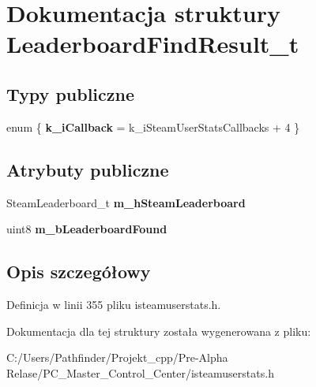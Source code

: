\hypertarget{struct_leaderboard_find_result__t}{}\section{Dokumentacja struktury Leaderboard\+Find\+Result\+\_\+t}
\label{struct_leaderboard_find_result__t}
\subsection*{Typy publiczne}
\begin{DoxyCompactItemize}
\item 
\mbox{\label{struct_leaderboard_find_result__t_a2596547072ed566b51ed82fd5e328947}} 
enum \{ {\bfseries k\+\_\+i\+Callback} = k\+\_\+i\+Steam\+User\+Stats\+Callbacks + 4
 \}
\end{DoxyCompactItemize}
\subsection*{Atrybuty publiczne}
\begin{DoxyCompactItemize}
\item 
\mbox{\label{struct_leaderboard_find_result__t_a358994c15b5c5a7d6c4a9875d34e1500}} 
Steam\+Leaderboard\+\_\+t {\bfseries m\+\_\+h\+Steam\+Leaderboard}
\item 
\mbox{\label{struct_leaderboard_find_result__t_aaca86faa1ccbceff400f6800b42a19d2}} 
uint8 {\bfseries m\+\_\+b\+Leaderboard\+Found}
\end{DoxyCompactItemize}


\subsection{Opis szczegółowy}


Definicja w linii 355 pliku isteamuserstats.\+h.



Dokumentacja dla tej struktury została wygenerowana z pliku\+:\begin{DoxyCompactItemize}
\item 
C\+:/\+Users/\+Pathfinder/\+Projekt\+\_\+cpp/\+Pre-\/\+Alpha Relase/\+P\+C\+\_\+\+Master\+\_\+\+Control\+\_\+\+Center/isteamuserstats.\+h\end{DoxyCompactItemize}
